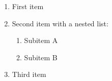 \begin{enumerate}
  \item First item
  \item Second item with a nested list:
    \begin{enumerate}
      \item Subitem A
      \item Subitem B
    \end{enumerate}
  \item Third item
\end{enumerate}